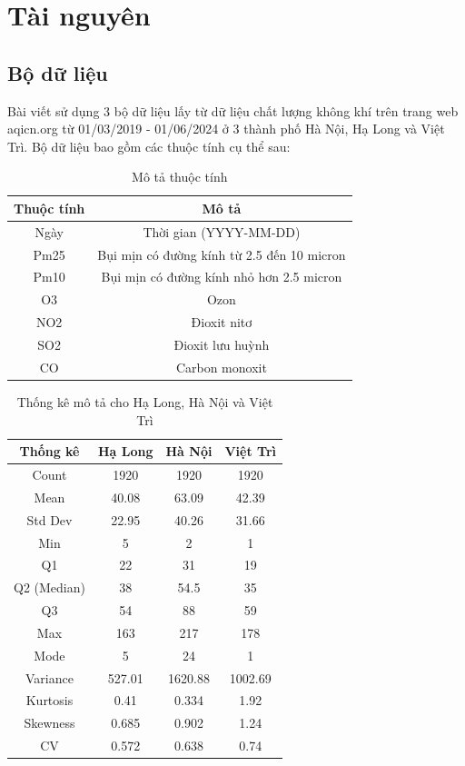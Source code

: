 \section{Tài nguyên}

\subsection{Bộ dữ liệu}
Bài viết sử dụng 3 bộ dữ liệu lấy từ dữ liệu chất lượng không khí trên trang web aqicn.org từ 01/03/2019 - 01/06/2024 ở 3 thành phố Hà Nội, Hạ Long và Việt Trì. Bộ dữ liệu bao gồm các thuộc tính cụ thể sau:
\begin{table}[h]
  \centering
  \caption{Mô tả thuộc tính}
  \begin{tabular}{|c|c|}
    \hline
    \textbf{Thuộc tính} & \textbf{Mô tả} \\ \hline
    Ngày & Thời gian (YYYY-MM-DD) \\ \hline
    Pm25 & Bụi mịn có đường kính từ 2.5 đến 10 micron \\ \hline
    Pm10 & Bụi mịn có đường kính nhỏ hơn 2.5 micron \\ \hline
    O3 & Ozon \\ \hline
    NO2 & Đioxit nitơ \\ \hline
    SO2 & Đioxit lưu huỳnh \\ \hline
    CO & Carbon monoxit \\ \hline
  \end{tabular}
\end{table}

\begin{table}[h!]
\centering
\caption{Thống kê mô tả cho Hạ Long, Hà Nội và Việt Trì}
\label{tab:stats}
\begin{tabular}{|c|c|c|c|}
\hline
\textbf{Thống kê} & \textbf{Hạ Long} & \textbf{Hà Nội} & \textbf{Việt Trì} \\
\hline
Count & 1920 & 1920 & 1920 \\
Mean & 40.08 & 63.09 & 42.39 \\
Std Dev & 22.95 & 40.26 & 31.66 \\
Min & 5 & 2 & 1 \\
Q1 & 22 & 31 & 19 \\
Q2 (Median) & 38 & 54.5 & 35 \\
Q3 & 54 & 88 & 59 \\
Max & 163 & 217 & 178 \\
Mode & 5 & 24 & 1 \\
Variance & 527.01 & 1620.88 & 1002.69 \\
Kurtosis & 0.41 & 0.334 & 1.92 \\
Skewness & 0.685 & 0.902 & 1.24 \\
CV & 0.572 & 0.638 & 0.74 \\
\hline
\end{tabular}
\end{table}


